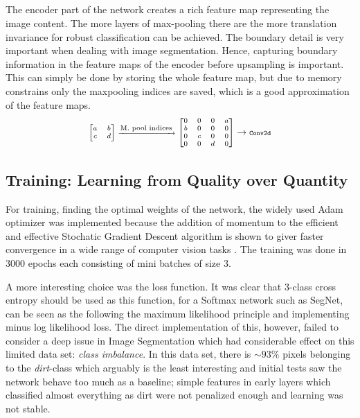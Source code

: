 \documentclass{article}
\begin{document}
\subsection{}
The encoder part of the network creates a rich feature map representing the image content. The more 
layers of max-pooling there are the more translation invariance for robust 
classification can be achieved. The boundary detail is very important when 
dealing with image segmentation. Hence, capturing boundary information in 
the feature maps of the encoder before upsampling is important. This can 
simply be done by storing the whole feature map, but due to memory 
constrains only the maxpooling indices are saved, which is a good 
approximation of the feature maps. 
\begin{equation*}\label{key}
\scriptsize
\begin{bmatrix}a&b\\c&d\end{bmatrix} \xrightarrow{\text{\scriptsize M. pool indices}}
\begin{bmatrix}0&0&0&a\\b&0&0&0\\0&c&0&0\\0&0&d&0\end{bmatrix} 
\rightarrow 
\texttt{\scriptsize Conv2d}
\end{equation*}
\subsection{Training: Learning from Quality over Quantity}
For training, finding the optimal weights of the network, the widely used Adam optimizer  was implemented because the addition of momentum to the efficient and effective Stochatic Gradient Descent algorithm is shown to giver faster convergence in a wide range of computer vision tasks \cite{Adam}. The training was done in 3000 epochs each consisting of mini batches of size 3.

A more interesting choice was the loss function. It was clear that 3-class cross entropy should be used as this function, for a Softmax network such as SegNet, can be seen as the following the maximum likelihood principle and implementing minus log likelihood loss. The direct implementation of this, however, failed to consider a deep issue in Image Segmentation which had considerable effect on this limited data set: \textit{class imbalance}. 
In this data set, there is \(\sim 93 \%\) pixels belonging to the \textit{dirt}-class which arguably is the least interesting and initial tests saw the network behave too much as a baseline; simple features in early layers which classified almost everything as dirt were not penalized enough and learning was not stable. 
\end{document}
